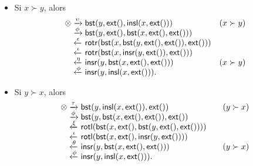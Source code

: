 \begin{itemize}

  \item Si \(x \succ y\), alors
\begin{equation*}
\begin{array}{@{}r@{\;}l@{\;}l@{\quad}r@{}}
\otimes
& \xrightarrow{\smash{\upsilon}} & 
  \fun{bst}(y,\fun{ext}(),\fun{insl}(x,\fun{ext}()))
& (x \succ y)\\
& \xrightarrow{\smash{\phi}} &
  \fun{bst}(y,\fun{ext}(),\fun{bst}(x,\fun{ext}(),\fun{ext}()))\\
& \xleftarrow{\smash{\epsilon}} &
\fun{rotr}(\fun{bst}(x,\fun{bst}(y,\fun{ext}(),\fun{ext}()),\fun{ext}()))\\
& \xleftarrow{\smash{\iota}} &
  \fun{rotr}(\fun{bst}(x,\fun{insr}(y,\fun{ext}()),\fun{ext}()))\\
& \xleftarrow{\smash{\eta}} &
  \fun{insr}(y,\fun{bst}(x,\fun{ext}(),\fun{ext}()))
& (x \succ y)\\
& \xleftarrow{\smash{\phi}} &
  \fun{insr}(y,\fun{insl}(x,\fun{ext}())).
\end{array}
\end{equation*}

  \item Si \(y \succ x\), alors
\begin{equation*}
\begin{array}{@{}r@{\;}l@{\;}l@{\qquad}r@{}}
\otimes & \xrightarrow{\smash{\tau}} &
  \fun{bst}(y,\fun{insl}(x,\fun{ext}()),\fun{ext}())
& (y \succ x)\\
& \xrightarrow{\smash{\phi}} &
  \fun{bst}(y,\fun{bst}(x,\fun{ext}(),\fun{ext}()),\fun{ext}())\\
& \xleftarrow{\smash{\xi}} &
\fun{rotl}(\fun{bst}(x,\fun{ext}(),\fun{bst}(y,\fun{ext}(),\fun{ext}())))\\
& \xleftarrow{\smash{\iota}} &
  \fun{rotl}(\fun{bst}(x,\fun{ext}(),\fun{insr}(y,\fun{ext}())))\\
& \xleftarrow{\smash{\theta}} &
  \fun{insr}(y,\fun{bst}(x,\fun{ext}(),\fun{ext}()))
& (y \succ x)\\
& \xleftarrow{\smash{\phi}} &
  \fun{insr}(y,\fun{insl}(x,\fun{ext}())).
\end{array}
\end{equation*}
\end{itemize}


